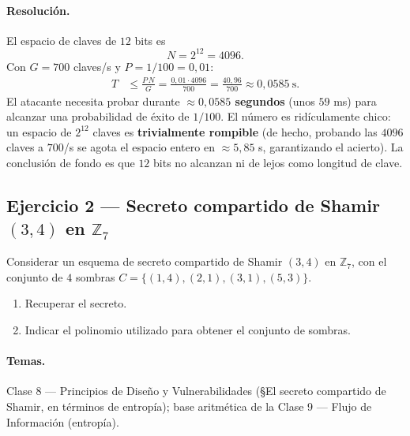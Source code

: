 \paragraph{Resolución.}
El espacio de claves de $12$ bits es
\begin{equation}
  N = 2^{12} = 4096 .
\end{equation}
Con $G = 700$ claves/s y $P = 1/100 = 0{,}01$:
\begin{align*}
  T &\le \frac{P\,N}{G} = \frac{0{,}01 \cdot 4096}{700}
       = \frac{40{,}96}{700} \approx 0{,}0585\ \text{s}.
\end{align*}
El atacante necesita probar durante \textbf{$\approx 0{,}0585$ segundos} (unos $59$ ms) para
alcanzar una probabilidad de éxito de $1/100$. El número es ridículamente chico: un espacio de
$2^{12}$ claves es \textbf{trivialmente rompible} (de hecho, probando las $4096$ claves a
$700$/s se agota el espacio entero en $\approx 5{,}85$ s, garantizando el acierto). La conclusión
de fondo es que $12$ bits no alcanzan ni de lejos como longitud de clave.

\subsection{Ejercicio 2 — Secreto compartido de Shamir $(3,4)$ en $\mathbb{Z}_7$}

\begin{consigna}
Considerar un esquema de secreto compartido de Shamir $(3,4)$ en $\mathbb{Z}_7$, con el conjunto
de $4$ sombras $C = \{(1,4),(2,1),(3,1),(5,3)\}$.
\begin{enumerate}
  \item[a)] Recuperar el secreto.
  \item[b)] Indicar el polinomio utilizado para obtener el conjunto de sombras.
\end{enumerate}
\end{consigna}

\paragraph{Temas.} Clase 8 — Principios de Diseño y Vulnerabilidades (\S El secreto compartido de
Shamir, en términos de entropía); base aritmética de la Clase 9 — Flujo de Información (entropía).

